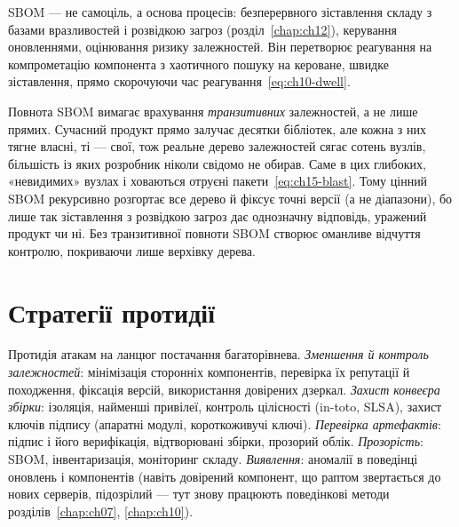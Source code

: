 \begin{tikzfig}
\end{tikzfig}

SBOM --- не самоціль, а основа процесів: безперервного зіставлення складу з базами вразливостей і розвідкою загроз (розділ~\ref{chap:ch12}), керування оновленнями, оцінювання ризику залежностей. Він перетворює реагування на компрометацію компонента з хаотичного пошуку на кероване, швидке зіставлення, прямо скорочуючи час реагування~\eqref{eq:ch10-dwell}.

Повнота SBOM вимагає врахування \emph{транзитивних} залежностей, а не лише прямих. Сучасний продукт прямо залучає десятки бібліотек, але кожна з них тягне власні, ті --- свої, тож реальне дерево залежностей сягає сотень вузлів, більшість із яких розробник ніколи свідомо не обирав. Саме в цих глибоких, «невидимих» вузлах і ховаються отруєні пакети~\eqref{eq:ch15-blast}. Тому цінний SBOM рекурсивно розгортає все дерево й фіксує точні версії (а не діапазони), бо лише так зіставлення з розвідкою загроз дає однозначну відповідь, уражений продукт чи ні. Без транзитивної повноти SBOM створює оманливе відчуття контролю, покриваючи лише верхівку дерева.

\section{Стратегії протидії}\label{sec:ch15-defense}

Протидія атакам на ланцюг постачання багаторівнева. \emph{Зменшення й контроль залежностей}: мінімізація сторонніх компонентів, перевірка їх репутації й походження, фіксація версій, використання довірених дзеркал. \emph{Захист конвеєра збірки}: ізоляція, найменші привілеї, контроль цілісності (in-toto, SLSA), захист ключів підпису (апаратні модулі, короткоживучі ключі). \emph{Перевірка артефактів}: підпис і його верифікація, відтворювані збірки, прозорий облік. \emph{Прозорість}: SBOM, інвентаризація, моніторинг складу. \emph{Виявлення}: аномалії в поведінці оновлень і компонентів (навіть довірений компонент, що раптом звертається до нових серверів, підозрілий --- тут знову працюють поведінкові методи розділів~\ref{chap:ch07}, \ref{chap:ch10}).

